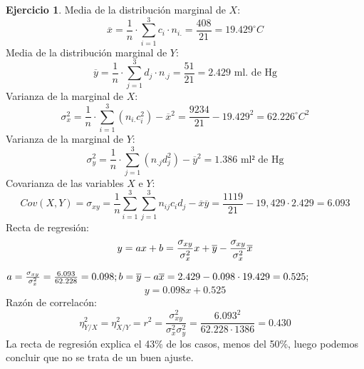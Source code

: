 \documentclass[a4paper, 12pt]{article}
\theoremstyle{definition}
\newtheorem{ej}{Ejercicio}
\begin{document}
\begin{ej}
Media de la distribución marginal de $X$:
\[
\overline{x} = \frac{1}{n}\cdot \sum_{i=1}^3 c_i\cdot n_{i.} = \frac{408}{21} = 19.429^{\circ}C
\]
Media de la distribución marginal de $Y$:
\[
\overline{y} = \frac{1}{n}\cdot \sum_{j=1}^3 d_j\cdot n_{.j} = \frac{51}{21} = 2.429\text{ ml. de Hg}
\]
Varianza de la marginal de $X$:
\[
\sigma_x^2 = \frac{1}{n}\cdot \sum_{i=1}^3 (n_{i.}  c_i^2) -\overline{x}^2 = \frac{9234}{21} - 19.429^2 = 62.226^{\circ} C^2
\]
Varianza de la marginal de $Y$:
\[
\sigma_y^2 = \frac{1}{n}\cdot \sum_{j=1}^3 (n_{.j}  d_j^2) -\overline{y}^2 = 1.386 \text{ ml² de Hg}
\]
Covarianza de las variables $X$ e $Y$:
\[
Cov(X,Y) = \sigma_{xy} = \frac{1}{n} \sum_{i=1}^3\sum_{j=1}^3 n_{ij} c_{i} d_{j} - \overline{x} \overline{y} = \frac{1119}{21} - 19,429\cdot 2.429 = 6.093
\]
Recta de regresión:
\[
y = ax + b = \frac{\sigma_{xy}}{\sigma_x^2}x + \overline{y} - \frac{\sigma_{xy}}{\sigma_x^2}\overline{x} \\
\]

\(
a= \frac{\sigma_{xy}}{\sigma_x^2} = \frac{6.093}{62.228}= 0.098 ; \\
b= \overline{y} - a\overline{x} = 2.429 - 0.098\cdot 19.429 = 0.525;
\)
\[
y=0.098x + 0.525
\]
Razón de correlacón:
\[
\eta_{Y/X}^{2} = \eta_{X/Y}^{2} = r^2 = \frac{\sigma_{xy}^2}{\sigma_x^2 \sigma_y^2} = \frac{6.093^2}{62.228\cdot 1386} = 0.430
\]
La recta de regresión explica el 43\% de los casos, menos del 50\%, luego podemos concluir que no se trata de un buen ajuste. \\


\end{ej}
\end{document}
